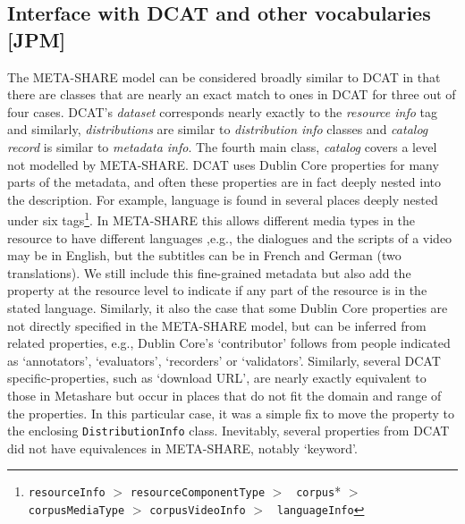 \documentclass{llncs}
\begin{document}
{\subsection{Interface with DCAT and other vocabularies [JPM]}
\label{sec:dcat}
The META-SHARE model can be considered broadly similar to DCAT in that there are
classes that are nearly an exact match to ones in DCAT for three out of four
cases. DCAT's \emph{dataset} corresponds nearly exactly to the \emph{resource
info} tag and similarly, \emph{distributions} are similar to \emph{distribution
info} classes and \emph{catalog record} is similar to \emph{metadata info}. The
fourth main class, \emph{catalog} covers a level not modelled by META-SHARE.
DCAT uses Dublin Core properties for many parts of the metadata, and often these
properties are in fact deeply nested into the description. For example, language
is found in several places deeply nested under six
tags\footnote{{\tt resourceInfo} $>$ {\tt resourceComponentType} $>$ {\tt
corpus}* $>$ {\tt corpusMediaType} $>$ {\tt corpusVideoInfo} $>$ {\tt
languageInfo}}. In META-SHARE this allows different media types in the resource
to have different languages ,e.g., the dialogues and the scripts of a video may
be in English, but the subtitles can be in French and German (two translations).
We still include this fine-grained metadata but also add the property at the resource level
to indicate if any part of the resource is in the stated language.
Similarly, it also the case that some Dublin Core properties are not directly
specified in the META-SHARE model, but can be inferred from related properties,
e.g., Dublin Core's `contributor' follows from people indicated as `annotators',
`evaluators', `recorders' or `validators'. Similarly, several DCAT specific-properties, such as `download URL', are nearly
exactly equivalent to those in Metashare but occur in places that do not fit the
domain and range of the properties. In this particular case, it was a simple fix
to move the property to the enclosing {\tt DistributionInfo} class.
Inevitably, several properties from DCAT did not have equivalences in
META-SHARE, notably `keyword'.
}
\end{document}
